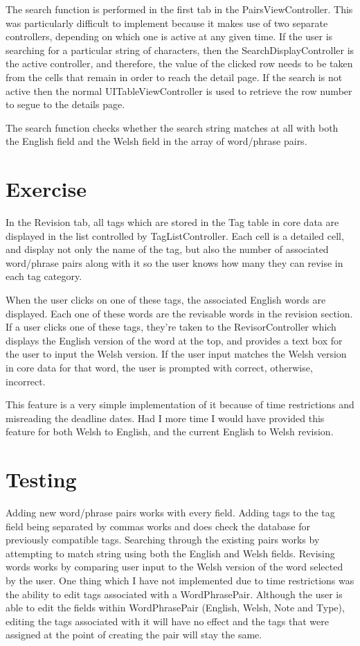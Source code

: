 \documentclass[11pt]{article}
\begin{document}
The search function is performed in the first tab in the PairsViewController. This was particularly difficult to implement because it makes use of two separate controllers, depending on which one is active at any given time. If the user is searching for a particular string of characters, then the SearchDisplayController is the active controller, and therefore, the value of the clicked row needs to be taken from the cells that remain in order to reach the detail page. If the search is not active then the normal UITableViewController is used to retrieve the row number to segue to the details page.

The search function checks whether the search string matches at all with both the English field and the Welsh field in the array of word/phrase pairs.
\section{Exercise}
In the Revision tab, all tags which are stored in the Tag table in core data are displayed in the list controlled by TagListController. Each cell is a detailed cell, and display not only the name of the tag, but also the number of associated word/phrase pairs along with it so the user knows how many they can revise in each tag category.

When the user clicks on one of these tags, the associated English words are displayed. Each one of these words are the revisable words in the revision section. If a user clicks one of these tags, they're taken to the RevisorController which displays the English version of the word at the top, and provides a text box for the user to input the Welsh version. If the user input matches the Welsh version in core data for that word, the user is prompted with correct, otherwise, incorrect. 

This feature is a very simple implementation of it because of time restrictions and misreading the deadline dates. Had I more time I would have provided this feature for both Welsh to English, and the current English to Welsh revision.
\section{Testing}
Adding new word/phrase pairs works with every field. Adding tags to the tag field being separated by commas works and does check the database for previously compatible tags. Searching through the existing pairs works by attempting to match string using both the English and Welsh fields. Revising words works by comparing user input to the Welsh version of the word selected by the user. One thing which I have not implemented due to time restrictions was the ability to edit tags associated with a WordPhrasePair. Although the user is able to edit the fields within WordPhrasePair (English, Welsh, Note and Type), editing the tags associated with it will have no effect and the tags that were assigned at the point of creating the pair will stay the same.
\end{document}
